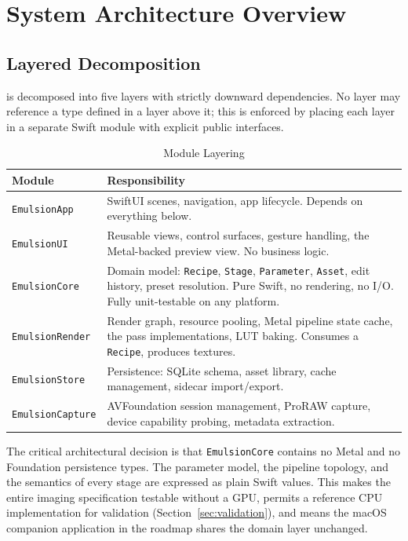 \section{System Architecture Overview}
\label{sec:arch}

\subsection{Layered Decomposition}

\EM{} is decomposed into five layers with strictly downward dependencies. No
layer may reference a type defined in a layer above it; this is enforced by
placing each layer in a separate Swift module with explicit public interfaces.

\begin{table}[htbp]
\caption{Module Layering}
\label{tab:layers}
\begin{center}
\renewcommand{\arraystretch}{1.15}
\begin{tabularx}{\columnwidth}{@{}l>{\raggedright\arraybackslash}X@{}}
\toprule
\textbf{Module} & \textbf{Responsibility} \\
\midrule
\texttt{EmulsionApp} & SwiftUI scenes, navigation, app lifecycle. Depends on everything below. \\
\texttt{EmulsionUI} & Reusable views, control surfaces, gesture handling, the Metal-backed preview view. No business logic. \\
\texttt{EmulsionCore} & Domain model: \texttt{Recipe}, \texttt{Stage}, \texttt{Parameter}, \texttt{Asset}, edit history, preset resolution. Pure Swift, no rendering, no I/O. Fully unit-testable on any platform. \\
\texttt{EmulsionRender} & Render graph, resource pooling, Metal pipeline state cache, the pass implementations, LUT baking. Consumes a \texttt{Recipe}, produces textures. \\
\texttt{EmulsionStore} & Persistence: SQLite schema, asset library, cache management, sidecar import/export. \\
\texttt{EmulsionCapture} & AVFoundation session management, ProRAW capture, device capability probing, metadata extraction. \\
\bottomrule
\end{tabularx}
\end{center}
\end{table}

The critical architectural decision is that \texttt{EmulsionCore} contains no
Metal and no Foundation persistence types. The parameter model, the pipeline
topology, and the semantics of every stage are expressed as plain Swift values.
This makes the entire imaging specification testable without a GPU, permits a
reference CPU implementation for validation (Section~\ref{sec:validation}), and
means the macOS companion application in the roadmap shares the domain layer
unchanged.

